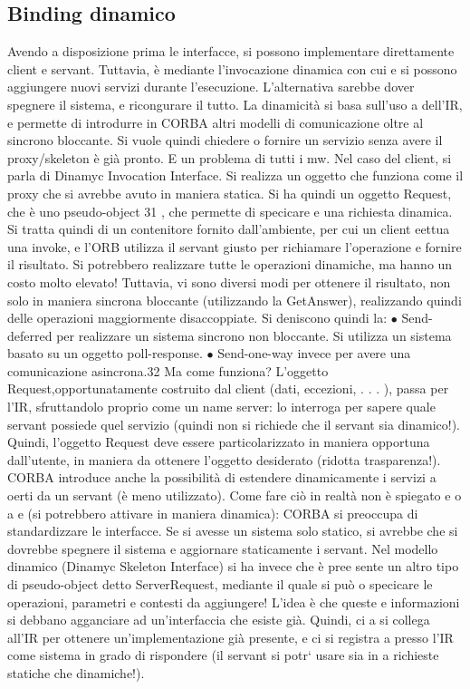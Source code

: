 \documentclass[a4paper,12pt]{article}
\begin{document}
\subsection{Binding dinamico}
Avendo a disposizione prima le interfacce, si possono implementare direttamente client e servant. Tuttavia, è mediante
l'invocazione dinamica con cui
e
si possono aggiungere nuovi servizi durante l'esecuzione. L'alternativa sarebbe
dover spegnere il sistema, e ricongurare il tutto. La dinamicità si basa sull'uso
a
dell'IR, e permette di introdurre in CORBA altri modelli di comunicazione oltre
al sincrono bloccante.
Si vuole quindi chiedere o fornire un servizio senza avere il proxy/skeleton è già pronto. E un problema di tutti i mw.
Nel caso del client, si parla di Dinamyc Invocation Interface. Si realizza un oggetto che funziona come il proxy che si
avrebbe avuto in maniera statica. Si ha quindi un oggetto Request, che è uno pseudo-object 31 , che permette di
specicare e una richiesta dinamica. Si tratta quindi di un contenitore fornito dall'ambiente,
per cui un client eettua una invoke, e l'ORB utilizza il servant giusto per
richiamare l'operazione e fornire il risultato. Si potrebbero realizzare tutte le
operazioni dinamiche, ma hanno un costo molto elevato! Tuttavia, vi sono
diversi modi per ottenere il risultato, non solo in maniera sincrona bloccante
(utilizzando la GetAnswer), realizzando quindi delle operazioni maggiormente
disaccoppiate. Si deniscono quindi la:
$\bullet$ Send-deferred per realizzare un sistema sincrono non bloccante. Si utilizza
un sistema basato su un oggetto poll-response.
$\bullet$ Send-one-way invece per avere una comunicazione asincrona.32
Ma come funziona? L'oggetto Request,opportunatamente costruito dal client
(dati, eccezioni, . . . ), passa per l'IR, sfruttandolo proprio come un name server: lo interroga per sapere quale
servant possiede quel servizio (quindi non si
richiede che il servant sia dinamico!). Quindi, l'oggetto Request deve essere particolarizzato in maniera opportuna
dall'utente, in maniera da ottenere l'oggetto
desiderato (ridotta trasparenza!).
CORBA introduce anche la possibilità di estendere dinamicamente i servizi
a
oerti da un servant (è meno utilizzato). Come fare ciò in realtà non è spiegato
e
o
a
e
(si potrebbero attivare in maniera dinamica): CORBA si preoccupa di standardizzare le interfacce. Se si avesse un
sistema solo statico, si avrebbe che si
dovrebbe spegnere il sistema e aggiornare staticamente i servant.
Nel modello dinamico (Dinamyc Skeleton Interface) si ha invece che è pree
sente un altro tipo di pseudo-object detto ServerRequest, mediante il quale si può
o
specicare le operazioni, parametri e contesti da aggiungere! L'idea è che queste
e
informazioni si debbano agganciare ad un'interfaccia che esiste già. Quindi, ci
a
si collega all'IR per ottenere un'implementazione già presente, e ci si registra
a
presso l'IR come sistema in grado di rispondere (il servant si potr` usare sia in
a
richieste statiche che dinamiche!).
\end{document}
